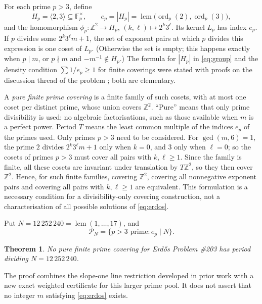 \documentclass[11pt,a4paper]{article}
\newtheorem{theorem}{Theorem}
\newcommand{\ord}{\operatorname{ord}}
\newcommand{\lcm}{\operatorname{lcm}}
\newcommand{\Z}{\mathbb Z}
\newcommand{\PN}{\mathcal P_N}
\begin{document}
For each prime $p>3$, define
\begin{equation}\label{eq:group}
  H_p=\langle 2,3\rangle\subseteq\mathbb F_p^\times,\qquad
  e_p=|H_p|=\lcm\bigl(\ord_p(2),\ord_p(3)\bigr),
\end{equation}
and the homomorphism $\phi_p:\Z^2\to H_p$, $(k,\ell)\mapsto2^k3^\ell$. Its kernel $L_p$ has index $e_p$. If $p$ divides some $2^k3^\ell m+1$, the set of exponent pairs at which $p$ divides this expression is one coset of $L_p$. (Otherwise the set is empty; this happens exactly when $p\mid m$, or $p\nmid m$ and $-m^{-1}\notin H_p$.) The formula for $|H_p|$ in \eqref{eq:group} and the density condition $\sum 1/e_p\ge1$ for finite coverings were stated with proofs on the discussion thread of the problem \cite{Forum203}; both are elementary.

A \emph{pure finite prime covering} is a finite family of such cosets, with at most one coset per distinct prime, whose union covers $\Z^2$. ``Pure'' means that only prime divisibility is used: no algebraic factorisations, such as those available when $m$ is a perfect power. Period $T$ means the least common multiple of the indices $e_p$ of the primes used. Only primes $p>3$ need to be considered. For $\gcd(m,6)=1$, the prime $2$ divides $2^k3^\ell m+1$ only when $k=0$, and $3$ only when $\ell=0$; so the cosets of primes $p>3$ must cover all pairs with $k,\ell\ge1$. Since the family is finite, all these cosets are invariant under translation by $T\Z^2$, so they then cover $\Z^2$. Hence, for such finite families, covering $\Z^2$, covering all nonnegative exponent pairs and covering all pairs with $k,\ell\ge1$ are equivalent. This formulation is a necessary condition for a divisibility-only covering construction, not a characterisation of all possible solutions of \eqref{eq:erdos}.

Put $N=12\,252\,240=\lcm(1,\ldots,17)$, and
\begin{equation}\label{eq:pool}
  \PN=\{p>3\text{ prime}:e_p\mid N\}.
\end{equation}

\begin{theorem}\label{thm:main}
No pure finite prime covering for Erd\H{o}s Problem \#203 has period dividing $N=12\,252\,240$.
\end{theorem}

The proof combines the slope-one line restriction developed in prior work \cite{ProblemADayOct14} with a new exact weighted certificate for this larger prime pool. It does not assert that no integer $m$ satisfying \eqref{eq:erdos} exists.
\end{document}
